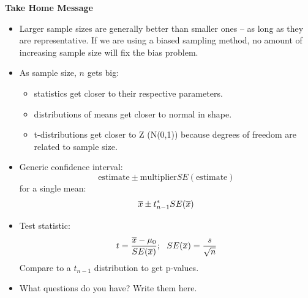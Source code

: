 \begin{center}
  {\large\bf Take Home Message}
\end{center}
 
\begin{itemize}
\item Larger sample sizes are generally better than smaller ones --
   as long as they are representative.  If we are using a biased
   sampling method, no amount of increasing sample size will fix the
   bias problem.
 \item As sample size, $n$ gets big:
   \begin{itemize}
   \item statistics get closer to their respective parameters.
   \item distributions of means get closer to normal in shape.
   \item t-distributions get closer to Z (N(0,1)) because degrees of
     freedom are related to sample size.
   \end{itemize}
 \item Generic confidence interval:
  $$ \mbox{estimate} \pm \mbox{multiplier} SE(\mbox{estimate})$$
    for a single mean:
  $$ \overline{x} \pm t^*_{n-1} SE(\overline{x})$$
  \item Test statistic:
   $$ t = \frac{\overline{x} - \mu_0}{SE(\overline{x})};\ \ SE(\overline{x}) =
   \frac{s}{\sqrt{n}}$$
    Compare to a $t_{n-1}$ distribution to get p-values.

 \item What questions do you have?  Write them here.

\end{itemize}




